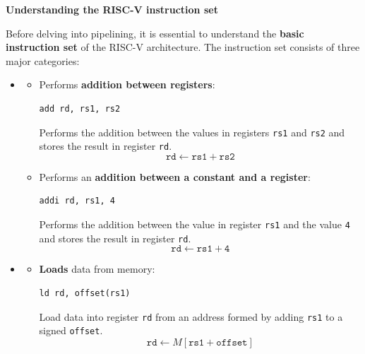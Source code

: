 \highspace
\begin{flushleft}
    \textcolor{Green3}{ \textbf{Understanding the RISC-V instruction set}}
\end{flushleft}
Before delving into pipelining, it is essential to understand the \textbf{basic instruction set} of the RISC-V architecture. The instruction set consists of three major categories:
\begin{itemize}
    \item {}
    \begin{itemize}
        \item Performs \textbf{addition between registers}:
        \begin{lstlisting}[language=riscv]
add rd, rs1, rs2\end{lstlisting}
        Performs the addition between the values in registers \texttt{rs1} and \texttt{rs2} and stores the result in register \texttt{rd}.
        \begin{equation*}
            \texttt{rd} \leftarrow \texttt{rs1} + \texttt{rs2}
        \end{equation*}

        \item Performs an \textbf{addition between a constant and a register}:
        \begin{lstlisting}[language=riscv]
addi rd, rs1, 4\end{lstlisting}
        Performs the addition between the value in register \texttt{rs1} and the value \texttt{4} and stores the result in register \texttt{rd}.
        \begin{equation*}
            \texttt{rd} \leftarrow \texttt{rs1} + \texttt{4}
        \end{equation*}
    \end{itemize}

    \item {}
    \begin{itemize}
        \item \textbf{Loads} data from memory:
        \begin{lstlisting}[language=riscv]
ld rd, offset(rs1)\end{lstlisting}
        Load data into register \texttt{rd} from an address formed by adding \texttt{rs1} to a signed \texttt{offset}.
        \begin{equation*}
            \texttt{rd} \leftarrow M\left[\texttt{rs1} + \texttt{offset}\right]
        \end{equation*}


\end{itemize}
\end{itemize}

